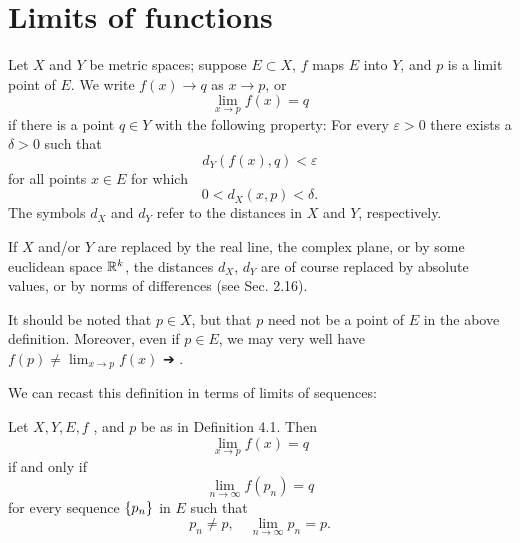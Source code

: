 \section{Limits of functions}

\begin{mydef}
    \label{def:4.1}
    Let $X$ and $Y$ be metric spaces; suppose $E \subset X$, $f$ maps $E$ into $Y$, and $p$ is a limit point of $E$. We write $f(x) \rightarrow q$ as $x \rightarrow p$, or
    \begin{equation}
        \label{eq:4.1}
        \lim_{x \to p} f(x) = q
    \end{equation}
    if there is a point $q \in Y$ with the following property: For every $\varepsilon > 0$ there exists a $\delta > 0$ such that
    \begin{equation}
        \label{eq:4.2}
        d_Y (f(x), q) < \varepsilon
    \end{equation}
    for all points $x \in E$ for which
    \begin{equation}
        \label{eq:4.3}
        0 < d_X (x, p) < \delta.
    \end{equation}
    The symbols $d_X$ and $d_Y$ refer to the distances in $X$ and $Y$,  respectively.
\end{mydef}
If $X$ and/or $Y$ are replaced by the real line, the complex plane, or by some euclidean space ${\protect\mathbb R}^{k}$, the distances $d_X$, $d_Y$ are of course replaced by absolute values, or by norms of differences (see Sec. 2.16).

It should be noted that $p \in X$, but that $p$ need not be a point of $E$ in the above definition. Moreover, even if $p \in E$, we may very well have $f(p) \neq \lim_{x \to p} f(x)$ ➔ .

We can recast this definition in terms of limits of sequences:

\begin{thm}
    \label{thm:4.2}
    Let $X,Y,E,f$ , and $p$ be as in Definition 4.1. Then
    \begin{equation}
        \label{eq:4.4}
        \lim_{x \to p} f(x) = q
    \end{equation}
    if and only if 
    \begin{equation}
        \label{eq:4.5}
        \lim_{n \to \infty} f(p_n) = q
    \end{equation}
    for every sequence $\protect\{p_n\}$ in $E$ such that
    \begin{equation}
        \label{eq:4.6}
        p_n \neq p, \quad
        \lim_{n \to \infty} p_n = p.
    \end{equation}
\end{thm}

